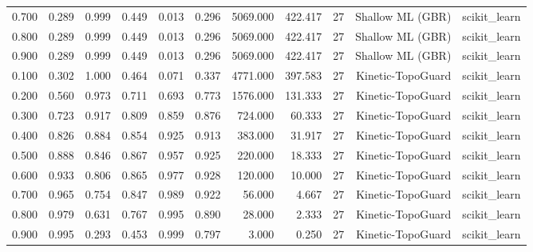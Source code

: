 \begin{tabular}{lrrrrrrrrrr}
0.700 & 0.289 & 0.999 & 0.449 & 0.013 & 0.296 & 5069.000 & 422.417 & 27 & Shallow ML (GBR) & scikit\_learn \\
0.800 & 0.289 & 0.999 & 0.449 & 0.013 & 0.296 & 5069.000 & 422.417 & 27 & Shallow ML (GBR) & scikit\_learn \\
0.900 & 0.289 & 0.999 & 0.449 & 0.013 & 0.296 & 5069.000 & 422.417 & 27 & Shallow ML (GBR) & scikit\_learn \\
0.100 & 0.302 & 1.000 & 0.464 & 0.071 & 0.337 & 4771.000 & 397.583 & 27 & Kinetic-TopoGuard & scikit\_learn \\
0.200 & 0.560 & 0.973 & 0.711 & 0.693 & 0.773 & 1576.000 & 131.333 & 27 & Kinetic-TopoGuard & scikit\_learn \\
0.300 & 0.723 & 0.917 & 0.809 & 0.859 & 0.876 & 724.000 & 60.333 & 27 & Kinetic-TopoGuard & scikit\_learn \\
0.400 & 0.826 & 0.884 & 0.854 & 0.925 & 0.913 & 383.000 & 31.917 & 27 & Kinetic-TopoGuard & scikit\_learn \\
0.500 & 0.888 & 0.846 & 0.867 & 0.957 & 0.925 & 220.000 & 18.333 & 27 & Kinetic-TopoGuard & scikit\_learn \\
0.600 & 0.933 & 0.806 & 0.865 & 0.977 & 0.928 & 120.000 & 10.000 & 27 & Kinetic-TopoGuard & scikit\_learn \\
0.700 & 0.965 & 0.754 & 0.847 & 0.989 & 0.922 & 56.000 & 4.667 & 27 & Kinetic-TopoGuard & scikit\_learn \\
0.800 & 0.979 & 0.631 & 0.767 & 0.995 & 0.890 & 28.000 & 2.333 & 27 & Kinetic-TopoGuard & scikit\_learn \\
0.900 & 0.995 & 0.293 & 0.453 & 0.999 & 0.797 & 3.000 & 0.250 & 27 & Kinetic-TopoGuard & scikit\_learn \\
\bottomrule
\end{tabular}